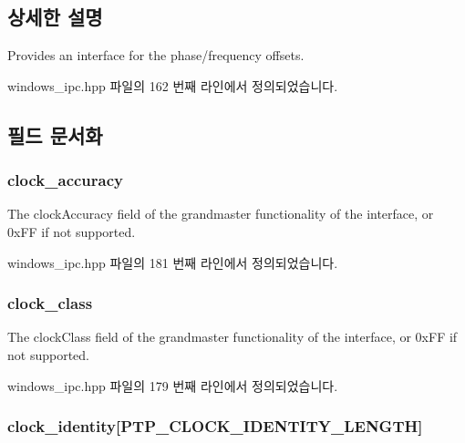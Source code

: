 \subsection{상세한 설명}
Provides an interface for the phase/frequency offsets. 

windows\+\_\+ipc.\+hpp 파일의 162 번째 라인에서 정의되었습니다.



\subsection{필드 문서화}
\subsubsection[{\texorpdfstring{clock\+\_\+accuracy}{clock_accuracy}}]{ clock\+\_\+accuracy}\hypertarget{class_offset_a708d6d971b6be997cf8d3e683951ceb0}{}\label{class_offset_a708d6d971b6be997cf8d3e683951ceb0}


The clock\+Accuracy field of the grandmaster functionality of the interface, or 0x\+FF if not supported. 



windows\+\_\+ipc.\+hpp 파일의 181 번째 라인에서 정의되었습니다.

\subsubsection[{\texorpdfstring{clock\+\_\+class}{clock_class}}]{ clock\+\_\+class}\hypertarget{class_offset_aafe98ca785cdce0ce5eaa26f2930d2fe}{}\label{class_offset_aafe98ca785cdce0ce5eaa26f2930d2fe}


The clock\+Class field of the grandmaster functionality of the interface, or 0x\+FF if not supported. 



windows\+\_\+ipc.\+hpp 파일의 179 번째 라인에서 정의되었습니다.

\subsubsection[{\texorpdfstring{clock\+\_\+identity}{clock_identity}}]{ clock\+\_\+identity\mbox{[}{\bf P\+T\+P\+\_\+\+C\+L\+O\+C\+K\+\_\+\+I\+D\+E\+N\+T\+I\+T\+Y\+\_\+\+L\+E\+N\+G\+TH}\mbox{]}}\hypertarget{class_offset_a9efbd85d909d77f7fd70f9f8391c49fa}{}\label{class_offset_a9efbd85d909d77f7fd70f9f8391c49fa}


